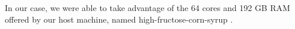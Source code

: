 In our case, we were able to take advantage of the 64 cores and 192 GB RAM offered by our host
machine, named high-fructose-corn-syrup \cite{thecomputersciencecluboftheuniversityofwaterloo2012}.
